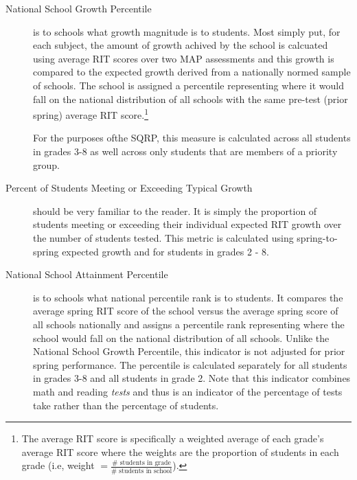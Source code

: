 \documentclass[sfsidenotes, justified]{tufte-handout}\usepackage[]{graphicx}\usepackage[]{color}
\begin{document}
\begin{description}
\item[National School Growth Percentile] is to schools what growth magnitude is to students.  Most simply put, for each  subject, the amount of growth achived by the school is calcuated using average RIT scores over two MAP assessments and this growth is compared to the expected growth derived from a nationally normed sample of schools. The school is assigned a percentile representing where it would fall on the national distribution of all schools with the same pre-test (prior spring) average RIT score.\footnote{The average RIT score is specifically a weighted average of each grade's average RIT score where the weights are the proportion of students in each grade (i.e, weight $=\frac{\# \mbox{ students in grade}}{\# \mbox{ students in school}}$).}

For the purposes ofthe SQRP, this measure is calculated across all students in grades 3-8 as well across only students that are  members of a priority group. 
\item[Percent of Students Meeting or Exceeding Typical Growth] should be very familiar to the reader.  It is simply the proportion of students meeting or exceeding their individual expected RIT growth over the number of students tested.  This metric is calculated using spring-to-spring expected growth and for students in grades 2 - 8.
\item[National School Attainment Percentile] is to schools what national percentile rank is to students. It compares the average spring RIT score of the school versus the average spring score of all schools nationally and assigns a percentile rank representing where the school would fall on the national distribution of all schools.  Unlike the National School Growth Percentile, this indicator is not adjusted for prior spring performance.  The percentile is calculated separately for all students in grades 3-8 and all students in grade 2.  Note that this indicator combines math and reading \emph{tests} and thus is an indicator of the percentage of tests take rather than the percentage of students.  
\end{description}
\end{document}
